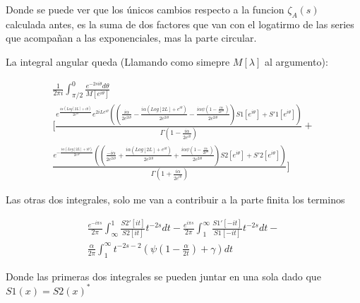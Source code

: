 Donde se puede ver que los únicos cambios respecto a la funcion $\zeta _A (s)$ calculada antes, es la suma de dos factores que van con el logatirmo de las series que acompañan a las exponenciales, mas la parte circular.

La integral angular queda (Llamando como simepre $M[\lambda]$ al argumento):

\begin{equation}
\begin{array}{c}

\frac{1}{2 \pi i} \int _{\pi /2 } ^{0} 
\frac{e ^{-2 s i \theta} d \theta}{M [e ^{i \theta}]} \\

\Bigg[

\frac{
e ^{\frac{i \alpha (Log[2 L] + i \theta)}{2 e ^{i \theta} }} e ^{2 i L e ^{i \theta}}

	\left(
		\left(
			\frac{i \alpha}{2 e ^{2 i \theta} } - 
			\frac{i \alpha( Log[2 L ] + e ^{i \theta} ) }{2 e^{2 i \theta}}
			- \frac{i \alpha \psi \left( 1 - \frac{i \alpha}{2 e ^{i \theta}}\right)}
				   {2 e ^{2 i \theta}}
			\right) S1 [e ^{i \theta}] +
		S'1 [e ^{i \theta }]
		\right)
}{\Gamma \left( 1 - \frac{i \alpha}{2 e ^{i \theta}} \right)} + \\

\frac{
e ^{- \frac{i \alpha (Log[2 L] + i \theta)}{2 e ^{i \theta} }}

	\left(
		\left(
			\frac{-i \alpha}{2 e ^{2 i \theta} } + 
			\frac{i \alpha( Log[2 L ] + e ^{i \theta} ) }{2 e^{2 i \theta}}
			+ \frac{i \alpha \psi \left( 1 - \frac{i \alpha}{2 e ^{i \theta}}\right)}
				   {2 e ^{2 i \theta}}
			\right) S2 [e ^{i \theta}] +
		S'2 [e ^{i \theta }]
		\right)
}{\Gamma \left( 1 + \frac{i \alpha}{2 e ^{i \theta}} \right)}

\Bigg]

\end{array}
\end{equation}



Las otras dos integrales, solo me van a contribuir a la parte finita los terminos

\begin{equation}
\begin{array}{c}
\frac{e ^{- i \pi s} }{2 \pi}
\int _ {\infty} ^{1}
\frac{S2 ' [i t]}{S2 [i t]}
t ^{-2 s } dt - 
\frac{e ^{ i \pi s} }{2 \pi}
\int _ {1} ^{\infty}
\frac{S1 ' [-i t]}{S1 [-i t]}
t ^{-2 s } dt  - \\
\frac{\alpha}{2 \pi}
\int _{1} ^{\infty }
t ^{-2s-2}
\left(
\psi \left( 1 - \frac{\alpha}{2 t} \right )+ \gamma
\right) dt
\end{array}
\end{equation}



Donde las primeras dos integrales se pueden juntar en una sola dado que $S1(x) = S2 (x) ^{*}$